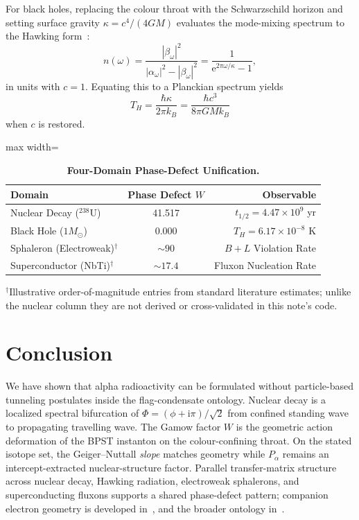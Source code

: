 \documentclass[11pt,a4paper]{article}
\theoremstyle{remark}
\newcommand{\ii}{\mathrm{i}}
\newcommand{\ee}{\mathrm{e}}
\begin{document}
For black holes, replacing the colour throat with the Schwarzschild
horizon and setting surface gravity $\kappa = c^4/(4GM)$ evaluates the
mode-mixing spectrum to the Hawking form~\cite{hawking1975}:
\begin{equation}
n(\omega) = \frac{|\beta_\omega|^2}{|\alpha_\omega|^2 - |\beta_\omega|^2}
= \frac{1}{\ee^{2\pi\omega / \kappa} - 1},
\end{equation}
in units with $c=1$.  Equating this to a Planckian spectrum yields
\begin{equation}
T_H = \frac{\hbar\kappa}{2\pi k_B}
= \frac{\hbar c^3}{8\pi G M k_B}
\end{equation}
when $c$ is restored.

\begin{table}[H]
\centering
\caption{\textbf{Four-Domain Phase-Defect Unification.}}
\label{tab:unification}
\vspace{0.2em}
\small
\setlength{\tabcolsep}{18pt}
\begin{adjustbox}{max width=\linewidth}\begin{tabular}{lcr}
\toprule
\textbf{Domain} & \textbf{Phase Defect $W$} & \textbf{Observable} \\
\midrule
Nuclear Decay ($^{238}\text{U}$) & 41.517 & $t_{1/2} = 4.47 \times 10^9$ yr \\
Black Hole ($1 M_\odot$) & 0.000 & $T_H = 6.17 \times 10^{-8}$ K \\
Sphaleron (Electroweak)$^{\dagger}$ & $\sim 90$ & $B+L$ Violation Rate \\
Superconductor (NbTi)$^{\dagger}$ & $\sim 17.4$ & Fluxon Nucleation Rate \\
\bottomrule
\end{tabular}\end{adjustbox}

\vspace{0.3em}
{\footnotesize $^{\dagger}$Illustrative order-of-magnitude entries from standard
literature estimates; unlike the nuclear column they are not derived or
cross-validated in this note's code.}
\end{table}

\section{Conclusion}
We have shown that alpha radioactivity can be formulated without
particle-based tunneling postulates inside the flag-condensate ontology.
Nuclear decay is a localized spectral bifurcation of
$\Phi = (\phi + \ii\pi)/\sqrt{2}$ from confined standing wave to
propagating travelling wave.  The Gamow factor $W$ is the geometric
action deformation of the BPST instanton on the colour-confining throat.
On the stated isotope set, the Geiger--Nuttall \emph{slope} matches
geometry while $P_\alpha$ remains an intercept-extracted nuclear-structure
factor.  Parallel transfer-matrix structure across nuclear decay,
Hawking radiation, electroweak sphalerons, and superconducting fluxons
supports a shared phase-defect pattern; companion electron geometry is
developed in~\cite{Mobius2026}, and the broader ontology in~\cite{KFM2026}.
\end{document}
